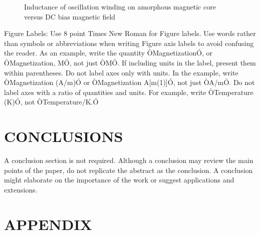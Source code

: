 \documentclass[letterpaper, 10 pt, conference]{ieeeconf}   %
\begin{document}
\begin{figure}[thpb]
	\centering
	\caption{Inductance of oscillation winding on amorphous
		magnetic core versus DC bias magnetic field}
	\label{figurelabel}
\end{figure}


Figure Labels: Use 8 point Times New Roman for Figure labels. Use words rather than symbols or abbreviations when writing Figure axis labels to avoid confusing the reader. As an example, write the quantity ÒMagnetizationÓ, or ÒMagnetization, MÓ, not just ÒMÓ. If including units in the label, present them within parentheses. Do not label axes only with units. In the example, write ÒMagnetization (A/m)Ó or ÒMagnetization {A[m(1)]}Ó, not just ÒA/mÓ. Do not label axes with a ratio of quantities and units. For example, write ÒTemperature (K)Ó, not ÒTemperature/K.Ó

\section{CONCLUSIONS}

A conclusion section is not required. Although a conclusion may review the main points of the paper, do not replicate the abstract as the conclusion. A conclusion might elaborate on the importance of the work or suggest applications and extensions.

\addtolength{\textheight}{-12cm}   %







\section*{APPENDIX}
\end{document}
